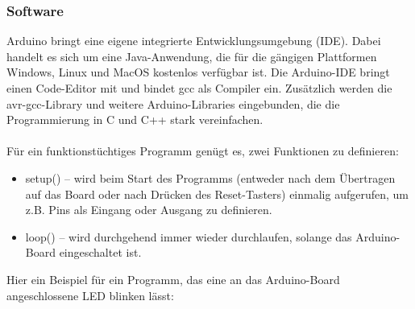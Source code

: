 \subsubsection{Software}
Arduino bringt eine eigene integrierte Entwicklungsumgebung (IDE). Dabei handelt es sich um eine Java-Anwendung, die für die gängigen Plattformen Windows, Linux und MacOS kostenlos verfügbar ist. Die Arduino-IDE bringt einen Code-Editor mit und bindet gcc als Compiler ein. Zusätzlich werden die avr-gcc-Library und weitere Arduino-Libraries eingebunden, die die Programmierung in C und C++ stark vereinfachen.\\
\\
Für ein funktionstüchtiges Programm genügt es, zwei Funktionen zu definieren:
\begin{itemize}
\item setup() – wird beim Start des Programms (entweder nach dem Übertragen auf das Board oder nach Drücken des Reset-Tasters) einmalig aufgerufen, um z.B. Pins als Eingang oder Ausgang zu definieren.
\item loop() – wird durchgehend immer wieder durchlaufen, solange das Arduino-Board eingeschaltet ist.
\end{itemize}
Hier ein Beispiel für ein Programm, das eine an das Arduino-Board angeschlossene LED blinken lässt:\\
\ \\
